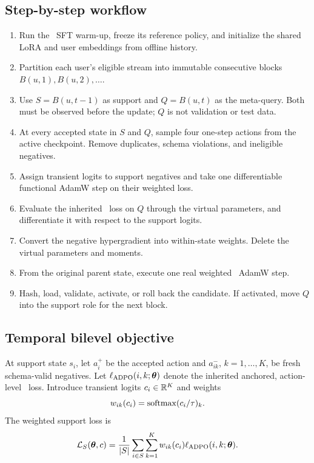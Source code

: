 \subsection{Step-by-step workflow}

\begin{enumerate}
  \item Run the \agenticdpo\ SFT warm-up, freeze its reference policy, and
  initialize the shared LoRA and user embeddings from offline history.
  \item Partition each user's eligible stream into immutable consecutive
  blocks $B(u,1),B(u,2),\ldots$.
  \item Use $S=B(u,t-1)$ as support and $Q=B(u,t)$ as the meta-query.  Both
  must be observed before the update; $Q$ is not validation or test data.
  \item At every accepted state in $S$ and $Q$, sample four one-step actions
  from the active checkpoint.  Remove duplicates, schema violations, and
  ineligible negatives.
  \item Assign transient logits to support negatives and take one
  differentiable functional AdamW step on their weighted loss.
  \item Evaluate the inherited \agenticdpo\ loss on $Q$ through the virtual
  parameters, and differentiate it with respect to the support logits.
  \item Convert the negative hypergradient into within-state weights.  Delete
  the virtual parameters and moments.
  \item From the original parent state, execute one real weighted
  \agenticdpo\ AdamW step.
  \item Hash, load, validate, activate, or roll back the candidate.  If
  activated, move $Q$ into the support role for the next block.
\end{enumerate}

\subsection{Temporal bilevel objective}

At support state $s_i$, let $a_i^+$ be the accepted action and
$a_{ik}^-$, $k=1,\ldots,K$, be fresh schema-valid negatives.  Let
$\ell_{\mathrm{ADPO}}(i,k;\bm{\theta})$ denote the inherited anchored,
action-level \agenticdpo\ loss.  Introduce transient logits
$c_i\in\mathbb{R}^K$ and weights
\begin{equation}
  w_{ik}(c_i)=\operatorname{softmax}(c_i/\tau)_k.
\end{equation}
The weighted support loss is
\begin{equation}
  \mathcal{L}_S(\bm{\theta},c)
  =
  \frac{1}{|S|}
  \sum_{i\in S}\sum_{k=1}^{K}
  w_{ik}(c_i)\ell_{\mathrm{ADPO}}(i,k;\bm{\theta}).
  \label{eq:tomorrow-support}
\end{equation}

